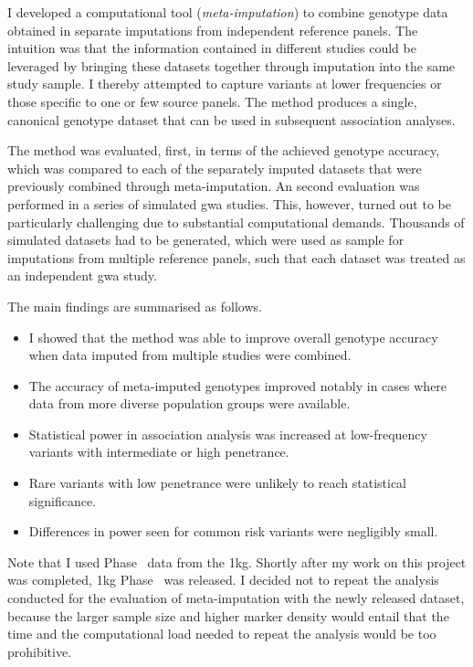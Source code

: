 I developed a computational tool (\emph{meta-imputation}) to combine genotype data obtained in separate imputations from independent reference panels.
The intuition was that the information contained in different studies could be leveraged by bringing these datasets together through imputation into the same study sample.
I thereby attempted to capture variants at lower frequencies or those specific to one or few source panels.
The method produces a single, canonical genotype dataset that can be used in subsequent association analyses.

The method was evaluated, first, in terms of the achieved genotype accuracy, which was compared to each of the separately imputed datasets that were previously combined through meta-imputation.
An second evaluation was performed in a series of simulated \gls{gwa} studies.
This, however, turned out to be particularly challenging due to substantial computational demands.
Thousands of simulated datasets had to be generated, which were used as sample for imputations from multiple reference panels, such that each dataset was treated as an independent \gls{gwa} study.

The main findings are summarised as follows.
\begin{itemize}
\item%
I showed that the method was able to improve overall genotype accuracy when data imputed from multiple studies were combined.
\item%
The accuracy of meta-imputed genotypes improved notably in cases where data from more diverse population groups were available.
\item%
Statistical power in association analysis was increased at low-frequency variants with intermediate or high penetrance.
\item%
Rare variants with low penetrance were unlikely to reach statistical significance.
\item%
Differences in power seen for common risk variants were negligibly small.
\end{itemize}

Note that I used Phase~ data from the \gls{1kg}.
Shortly after my work on this project was completed, \gls{1kg} Phase~ was released.
I decided not to repeat the analysis conducted for the evaluation of meta-imputation with the newly released dataset, because the larger sample size and higher marker density would entail that the time and the computational load needed to repeat the analysis would be too prohibitive.

